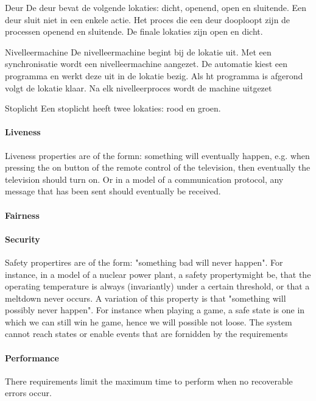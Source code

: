 Deur
De deur bevat de volgende lokaties: dicht, openend, open en sluitende.
Een deur sluit niet in een enkele actie. Het proces die een deur dooploopt zijn de processen openend en sluitende. De finale lokaties zijn open en dicht.

Nivelleermachine
De nivelleermachine begint bij de lokatie uit. Met een synchronisatie wordt een nivelleermachine aangezet. De automatie kiest een programma en werkt deze uit in de lokatie bezig. Als ht programma is afgerond volgt de lokatie klaar. Na elk nivelleerproces wordt de machine uitgezet

Stoplicht
Een stoplicht heeft twee lokaties: rood en groen.



 
\paragraph{Liveness}
Liveness properties are of the formn: something will eventually happen, e.g. when pressing the on button of the remote control of the television, then eventually the television should turn on. Or in a model of a  communication protocol, any message that has been sent should eventually be received.
\paragraph{Fairness}
\paragraph{Security}
Safety propertires are of the form: "something bad will never happen". For instance, in a model of a nuclear power plant, a safety propertymight be, that the operating temperature is always (invariantly) under a certain threshold, or that a meltdown never occurs. A variation of this property is that "something will possibly never happen".
For instance when playing a game, a safe state is one in which we can still win he game, hence we will possible not loose.
The system cannot reach states or enable events that are fornidden by the requirements
\paragraph{Performance}
There requirements limit the maximum time to perform when no recoverable errors occur.









